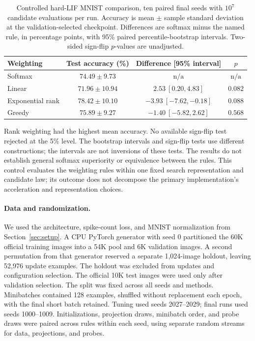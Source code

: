 \begin{table}[t]
\centering
\caption{Controlled hard-LIF MNIST comparison, ten paired final seeds with
$10^7$ candidate evaluations per run. Accuracy is mean $\pm$ sample standard
deviation at the validation-selected checkpoint. Differences are softmax
minus the named rule, in percentage points, with 95\% paired percentile-bootstrap
intervals. Two-sided sign-flip $p$-values are unadjusted.}
\label{tab:controlled-weighting}
\small
\begin{tabular}{lccc}
\toprule
Weighting & Test accuracy (\%) & Difference [95\% interval] & $p$ \\
\midrule
Softmax & $74.49\pm9.73$ & $\mathrm{n/a}$ & $\mathrm{n/a}$ \\
Linear & $71.96\pm10.94$ & $2.53\ [0.20,4.83]$ & $0.082$ \\
Exponential rank & $78.42\pm10.10$ & $-3.93\ [-7.62,-0.18]$ & $0.088$ \\
Greedy & $75.89\pm9.27$ & $-1.40\ [-5.82,2.62]$ & $0.568$ \\
\bottomrule
\end{tabular}
\end{table}

Rank weighting had the highest mean accuracy. No available sign-flip test
rejected at the 5\% level. The bootstrap intervals and sign-flip tests use
different constructions; the intervals are not inversions of these tests.
The results do not establish general softmax superiority or equivalence
between the rules. This control evaluates the weighting rules within one fixed search representation
and candidate law; its outcome does not decompose the primary implementation's
acceleration and representation choices.

\paragraph{Data and randomization.}
We used the architecture, spike-count loss, and MNIST normalization from
Section~\ref{sec:setup}. A CPU PyTorch generator with seed 0 partitioned the
60K official training images into a 54K pool and 6K validation images.
A second permutation from that generator reserved a separate 1,024-image
holdout, leaving 52,976 update examples. The holdout was excluded from
updates and configuration selection. The official
10K test images were used only after validation selection. The split was
fixed across all seeds and methods. Minibatches contained 128 examples,
shuffled without replacement each epoch, with the final short batch retained.
Tuning used seeds 2027--2029; final runs used seeds 1000--1009. Initializations,
projection draws, minibatch order, and probe draws were paired across rules
within each seed, using separate random streams for data, projections, and probes.

